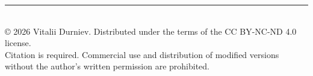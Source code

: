 \documentclass[aps,prd,onecolumn,nofootinbib,superscriptaddress]{revtex4-2} %
\begin{document}


    \vfill
    \begin{center}
        \rule{0.5\textwidth}{.4pt} \\
        \vspace{2mm}
        \footnotesize
        © 2026 Vitalii Durniev. Distributed under the terms of the CC BY-NC-ND 4.0 license. \\
        Citation is required. Commercial use and distribution of modified versions without the author's written permission are prohibited.
    \end{center}
\end{document}
